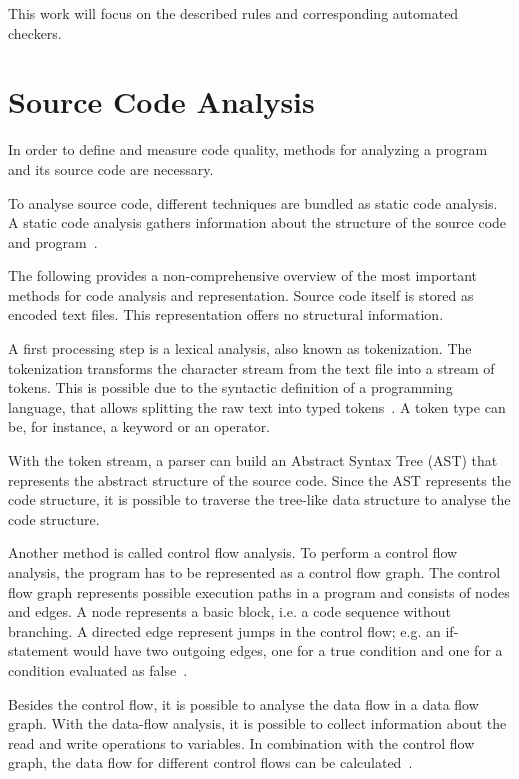 This work will focus on the described rules and corresponding automated checkers.

\section{Source Code Analysis}\label{sec:code_analysis}
In order to define and measure code quality, methods for analyzing a program and its source code are necessary.

To analyse source code, different techniques are bundled as static code analysis. A static code analysis gathers information about the structure of the source code and program~\cite{prahofer_static_2017}.

The following provides a non-comprehensive overview of the most important methods for code analysis and representation.
Source code itself is stored as encoded text files. This representation offers no structural information. 

A first processing step is a lexical analysis, also known as tokenization. The tokenization transforms the character stream from the text file into a stream of tokens. This is possible due to the syntactic definition of a programming language, that allows splitting the raw text into typed tokens~\cite{mogensen_introduction_2017}. A token type can be, for instance, a keyword or an operator.

With the token stream, a parser can build an Abstract Syntax Tree (AST) that represents the abstract structure of the source code.
Since the AST represents the code structure, it is possible to traverse the tree-like data structure to analyse the code structure.

Another method is called control flow analysis. To perform a control flow analysis, the program has to be represented as a control flow graph. The control flow graph represents possible execution paths in a program and consists of nodes and edges. A node represents a basic block, i.e. a code sequence without branching. A directed edge represent jumps in the control flow; e.g. an if-statement would have two outgoing edges, one for a true condition and one for a condition evaluated as false~\cite{allen_control_1970}.

Besides the control flow, it is possible to analyse the data flow in a data flow graph. With the data-flow analysis, it is possible to collect information about the read and write operations to variables. In combination with the control flow graph, the data flow for different control flows can be calculated~\cite{mogensen_introduction_2017}.

